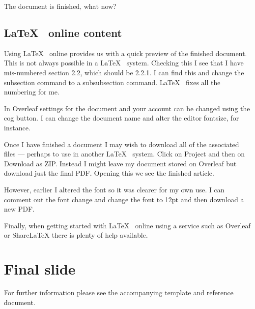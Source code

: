 \documentclass[a4paper,14pt]{extarticle}
\begin{document}
The document is finished, what now? 

\subsection{\LaTeX~ online content}

Using \LaTeX~ online provides us with a quick preview of the finished document. This is not always possible in a \LaTeX~ system. Checking this I see that I have mis-numbered section 2.2, which should be 2.2.1. I can find this and change the subsection command to a subsubsection command. \LaTeX~ fixes all the numbering for me. 

In Overleaf settings for the document and your account can be changed using the cog button. I can change the document name and alter the editor fontsize, for instance. 

Once I have finished a document I may wish to download all of the associated files --- perhaps to use in another \LaTeX~ system. Click on Project and then on Download as ZIP. Instead I might leave my document stored on Overleaf but download just the final PDF. Opening this we see the finished article. 

However, earlier I altered the font so it was clearer for my own use. I can comment out the font change and change the font to 12pt and then download a new PDF. 

Finally, when getting started with \LaTeX~ online using a service such as Overleaf or ShareLaTeX there is plenty of help available. 

\section{Final slide}

For further information please see the accompanying template and reference document. 
\end{document}

